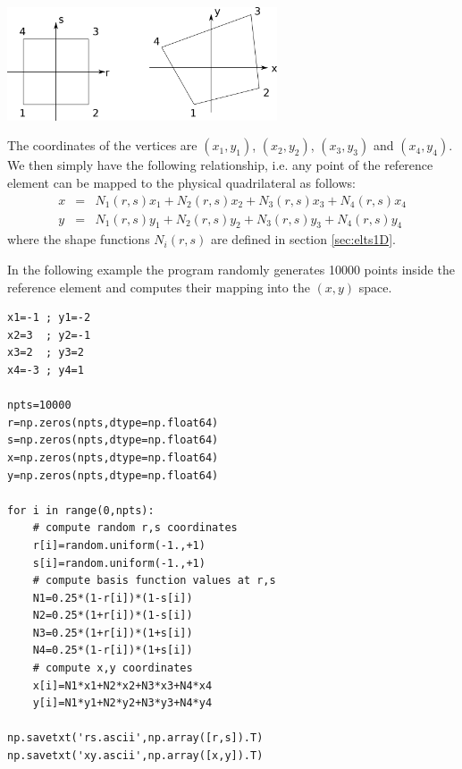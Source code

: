 \begin{center}
\includegraphics[width=8cm]{images/mappings/bilinear/mapping_bilinear.png}
\end{center}

The coordinates of the vertices are 
$(x_1,y_1)$, $(x_2,y_2)$, $(x_3,y_3)$ and $(x_4,y_4)$.
We then simply have the 
following relationship, i.e. any point of the reference element 
can be mapped to the physical quadrilateral as follows:
\begin{eqnarray}
x&=& N_1(r,s) x_1 + N_2(r,s) x_2 + N_3(r,s) x_3 + N_4(r,s) x_4 \\
y&=& N_1(r,s) y_1 + N_2(r,s) y_2 + N_3(r,s) y_3 + N_4(r,s) y_4 
\end{eqnarray} 
where the shape functions $N_i(r,s)$ are defined in section \ref{sec:elts1D}.

In the following example the program randomly generates 10000 points inside the reference 
element and computes their mapping into the $(x,y)$ space. 

\begin{lstlisting}
x1=-1 ; y1=-2
x2=3  ; y2=-1
x3=2  ; y3=2
x4=-3 ; y4=1

npts=10000
r=np.zeros(npts,dtype=np.float64)   
s=np.zeros(npts,dtype=np.float64)   
x=np.zeros(npts,dtype=np.float64)   
y=np.zeros(npts,dtype=np.float64)   

for i in range(0,npts):
    # compute random r,s coordinates
    r[i]=random.uniform(-1.,+1)
    s[i]=random.uniform(-1.,+1)
    # compute basis function values at r,s
    N1=0.25*(1-r[i])*(1-s[i])
    N2=0.25*(1+r[i])*(1-s[i])
    N3=0.25*(1+r[i])*(1+s[i])
    N4=0.25*(1-r[i])*(1+s[i])
    # compute x,y coordinates
    x[i]=N1*x1+N2*x2+N3*x3+N4*x4
    y[i]=N1*y1+N2*y2+N3*y3+N4*y4

np.savetxt('rs.ascii',np.array([r,s]).T)
np.savetxt('xy.ascii',np.array([x,y]).T)
\end{lstlisting}

